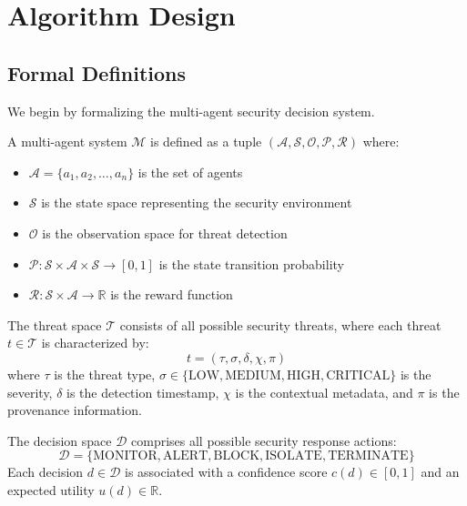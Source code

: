 
\section{Algorithm Design}
\label{sec:algorithm}

\subsection{Formal Definitions}
\label{subsec:definitions}

We begin by formalizing the multi-agent security decision system.

\begin{definition}
\label{def:mas}
A multi-agent system $\mathcal{M}$ is defined as a tuple $(\mathcal{A}, \mathcal{S}, \mathcal{O}, \mathcal{P}, \mathcal{R})$ where:
\begin{itemize}
    \item $\mathcal{A} = \{a_1, a_2, \ldots, a_n\}$ is the set of agents
    \item $\mathcal{S}$ is the state space representing the security environment
    \item $\mathcal{O}$ is the observation space for threat detection
    \item $\mathcal{P}: \mathcal{S} \times \mathcal{A} \times \mathcal{S} \rightarrow [0,1]$ is the state transition probability
    \item $\mathcal{R}: \mathcal{S} \times \mathcal{A} \rightarrow \mathbb{R}$ is the reward function
\end{itemize}
\end{definition}

\begin{definition}
\label{def:threat}
The threat space $\mathcal{T}$ consists of all possible security threats, where each threat $t \in \mathcal{T}$ is characterized by:
\begin{equation}
t = (\tau, \sigma, \delta, \chi, \pi)
\end{equation}
where $\tau$ is the threat type, $\sigma \in \{\text{LOW}, \text{MEDIUM}, \text{HIGH}, \text{CRITICAL}\}$ is the severity, $\delta$ is the detection timestamp, $\chi$ is the contextual metadata, and $\pi$ is the provenance information.
\end{definition}

\begin{definition}
\label{def:decision}
The decision space $\mathcal{D}$ comprises all possible security response actions:
\begin{equation}
\mathcal{D} = \{\text{MONITOR}, \text{ALERT}, \text{BLOCK}, \text{ISOLATE}, \text{TERMINATE}\}
\end{equation}
Each decision $d \in \mathcal{D}$ is associated with a confidence score $c(d) \in [0,1]$ and an expected utility $u(d) \in \mathbb{R}$.
\end{definition}

